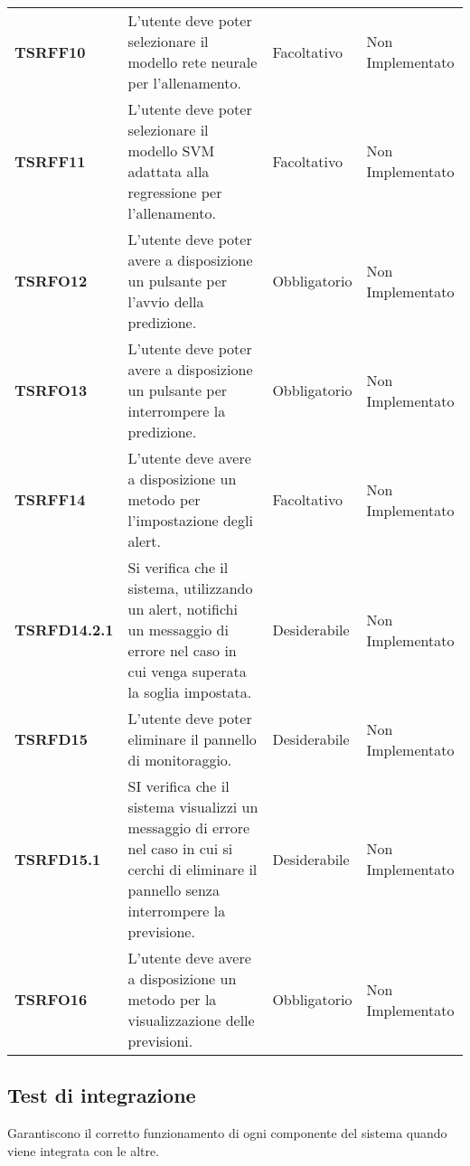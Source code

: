 \documentclass[../piano-di-qualifica.tex]{subfiles}
\begin{document}
\begin{longtable}[H]{>{\centering\bfseries}m{2.5cm} >{\centering}m{7.5cm} >{\centering}m{2.5cm} >{\centering\arraybackslash}m{3.5cm}}
  \textbf{TSRFF10} & L'utente deve poter selezionare il modello rete neurale per l’allenamento. & Facoltativo & Non Implementato \\

  \textbf{TSRFF11} & L'utente deve poter selezionare il modello SVM adattata alla regressione per l’allenamento. & Facoltativo & Non Implementato \\

  \textbf{TSRFO12} & L'utente deve poter avere a disposizione un pulsante per l’avvio della predizione. & Obbligatorio & Non Implementato \\

  \textbf{TSRFO13} & L'utente deve poter avere a disposizione un pulsante per interrompere la predizione. & Obbligatorio & Non Implementato \\

  \textbf{TSRFF14} & L'utente deve avere a disposizione un metodo per l’impostazione degli alert. & Facoltativo & Non Implementato \\

  \textbf{TSRFD14.2.1} & Si verifica che il sistema, utilizzando un alert, notifichi un messaggio di errore nel caso in cui venga superata la soglia impostata. & Desiderabile & Non Implementato \\

  \textbf{TSRFD15} & L'utente deve poter eliminare il pannello di monitoraggio. & Desiderabile & Non Implementato \\

  \textbf{TSRFD15.1} & SI verifica che il sistema visualizzi un messaggio di errore nel caso in cui si cerchi di eliminare il pannello senza interrompere la previsione. & Desiderabile & Non Implementato \\

  \textbf{TSRFO16} & L'utente deve avere a disposizione un metodo per la visualizzazione delle previsioni. & Obbligatorio & Non Implementato \\

\end{longtable}

\subsection{Test di integrazione}
\label{sub:test_di_integrazione}
Garantiscono il corretto funzionamento di ogni componente del sistema quando viene integrata con le altre.
\end{document}

